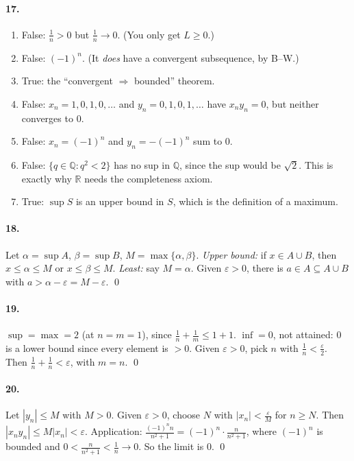 \documentclass[11pt]{article}
\theoremstyle{definition}
\newcommand{\Q}{\mathbb{Q}}
\newcommand{\R}{\mathbb{R}}
\newcommand{\eps}{\varepsilon}
\begin{document}
\paragraph{17.}
\begin{enumerate}[label=(\alph*),nosep]
  \item False: $\frac1n>0$ but $\frac1n\to0$. (You only get $L\ge0$.)
  \item False: $(-1)^n$. (It \emph{does} have a convergent subsequence, by B--W.)
  \item True: the ``convergent $\Rightarrow$ bounded'' theorem.
  \item False: $x_n=1,0,1,0,\dots$ and $y_n=0,1,0,1,\dots$ have $x_ny_n=0$,
        but neither converges to $0$.
  \item False: $x_n=(-1)^n$ and $y_n=-(-1)^n$ sum to $0$.
  \item False: $\{q\in\Q:q^2<2\}$ has no sup in $\Q$, since the sup would be
        $\sqrt2$. This is exactly why $\R$ needs the completeness axiom.
  \item True: $\sup S$ is an upper bound in $S$, which is the definition of
        a maximum.
\end{enumerate}

\paragraph{18.} Let $\alpha=\sup A$, $\beta=\sup B$, $M=\max\{\alpha,\beta\}$.
\emph{Upper bound:} if $x\in A\cup B$, then $x\le\alpha\le M$ or
$x\le\beta\le M$. \emph{Least:} say $M=\alpha$. Given $\eps>0$, there is
$a\in A\subseteq A\cup B$ with $a>\alpha-\eps=M-\eps$. \qed

\paragraph{19.} $\sup=\max=2$ (at $n=m=1$), since $\frac1n+\frac1m\le1+1$.
$\inf=0$, not attained: $0$ is a lower bound since every element is $>0$.
Given $\eps>0$, pick $n$ with $\frac1n<\frac\eps2$. Then
$\frac1n+\frac1n<\eps$, with $m=n$. \qed

\paragraph{20.} Let $|y_n|\le M$ with $M>0$. Given $\eps>0$, choose $N$ with
$|x_n|<\frac\eps M$ for $n\ge N$. Then $|x_ny_n|\le M|x_n|<\eps$.
Application: $\frac{(-1)^nn}{n^2+1}=(-1)^n\cdot\frac{n}{n^2+1}$, where
$(-1)^n$ is bounded and $0<\frac n{n^2+1}<\frac1n\to0$. So the limit is
$0$. \qed
\end{document}
